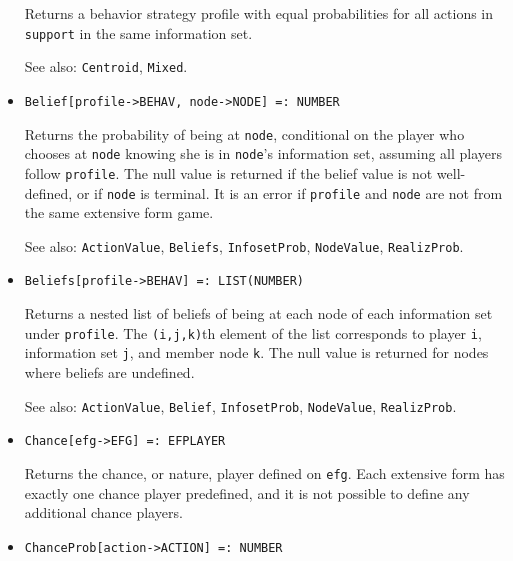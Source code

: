\begin{itemize}
\bd
Returns a behavior strategy profile with equal
probabilities for all actions in \verb+support+ in the same information set. 
\item [See also:] \verb+Centroid+, \verb+Mixed+.
\ed

\item{}
\protect \large \begin{verbatim}
Belief[profile->BEHAV, node->NODE] =: NUMBER 
\end{verbatim}\normalsize

\bd
Returns the probability of being at \verb+node+, conditional on the
player who chooses at \verb+node+ knowing she is in \verb+node+'s
information set, assuming all players follow \verb+profile+.  The null
value is returned if the belief value is not well-defined, or if
\verb+node+ is terminal.  It is an error if \verb+profile+ and \verb+node+
are not from the same extensive form game.
\item [See also:] \verb+ActionValue+, \verb+Beliefs+, \verb+InfosetProb+,
\verb+NodeValue+, \verb+RealizProb+.
\ed

\item{}
\protect \large \begin{verbatim}
Beliefs[profile->BEHAV] =: LIST(NUMBER) 
\end{verbatim}\normalsize

\bd 
Returns a nested list of
beliefs of being at each node of each information set under
\verb+profile+. The \verb+(i,j,k)+th element of the list corresponds
to player \verb+i+, information set \verb+j+, and member node
\verb+k+. The null value is returned for nodes where beliefs are
undefined.

\item [See also:] \verb+ActionValue+, \verb+Belief+, \verb+InfosetProb+,
\verb+NodeValue+, \verb+RealizProb+.
\ed





\item{}
\protect \large \begin{verbatim}
Chance[efg->EFG] =: EFPLAYER 
\end{verbatim}\normalsize

\bd
Returns the chance, or nature, player defined on \verb+efg+.
Each extensive form has exactly one
chance player predefined, and it is not possible to define any additional
chance players.
\ed

\item{}
\protect \large \begin{verbatim}
ChanceProb[action->ACTION] =: NUMBER 
\end{verbatim}\normalsize


\end{itemize}
